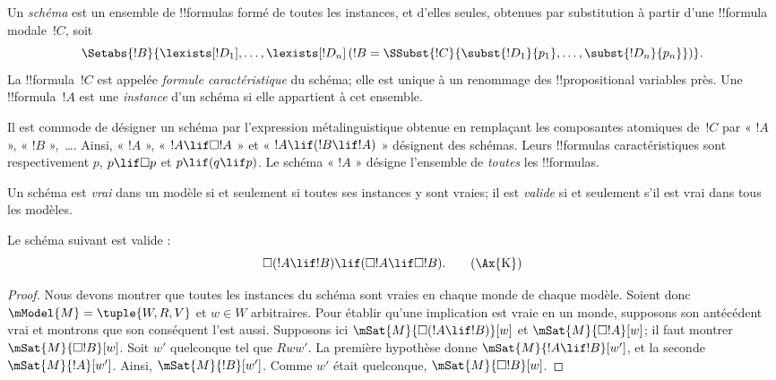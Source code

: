 \documentclass[../../../include/open-logic-section]{subfiles}
\begin{document}


\begin{defn}
  Un \emph{schéma} est un ensemble de !!{formula}s formé de
  toutes les instances, et d'elles seules, obtenues par
  substitution à partir d'une !!{formula} modale~$!C$, soit
  \[
  \Setabs{!B}{\lexists[!D_1], \dots, \lexists[!D_n] \left(!B =
  \SSubst{!C}{\subst{!D_1}{p_1}, \dots, \subst{!D_n}{p_n}} \right) }.
  \]
  La !!{formula}~$!C$ est appelée \emph{formule caractéristique}
  du schéma; elle est unique à un renommage des !!{propositional
  variable}s près. Une !!{formula}~$!A$ est une \emph{instance}
  d'un schéma si elle appartient à cet ensemble.
\end{defn}

Il est commode de désigner un schéma par l'expression métalinguistique
obtenue en remplaçant les composantes atomiques de~$!C$ par
« $!A$ », « $!B$ »,~\dots. Ainsi, « $!A$ »,
« $!A \lif \Box!A$ » et « $!A \lif (!B \lif !A)$ »
désignent des schémas. Leurs !!{formula}s caractéristiques sont
respectivement $p$, $p \lif \Box p$ et $p \lif (q \lif p)$.
Le schéma « $!A$ » désigne l'ensemble de \emph{toutes} les
!!{formula}s.

\begin{defn}
  Un schéma est \emph{vrai} dans un modèle si et seulement si
  toutes ses instances y sont vraies; il est \emph{valide} si et
  seulement s'il est vrai dans tous les modèles.
\end{defn}

\begin{prop}
  Le schéma  suivant est valide :
  \begin{equation*}
  \Box(!A \lif !B) \lif (\Box !A \lif \Box !B). \tag{\Ax{K}}
  \end{equation*}
\end{prop}

\begin{proof}
  Nous devons montrer que toutes les instances du schéma sont
  vraies en chaque monde de chaque modèle. Soient donc
  $\mModel{M} = \tuple{W,R,V}$ et $w \in W$ arbitraires.
  Pour établir qu'une implication est vraie en un monde, supposons
  son antécédent vrai et montrons que son conséquent l'est aussi.
  Supposons ici $\mSat{M}{\Box(!A \lif !B)}[w]$ et
  $\mSat{M}{\Box !A}[w]$; il faut montrer
  $\mSat{M}{\Box !B}[w]$. Soit $w'$ quelconque tel que $Rww'$.
  La première hypothèse donne $\mSat{M}{!A \lif !B}[w']$,
  et la seconde $\mSat{M}{!A}[w']$. Ainsi,
  $\mSat{M}{!B}[w']$. Comme $w'$ était quelconque,
  $\mSat{M}{\Box !B}[w]$.
\end{proof}
\end{document}
